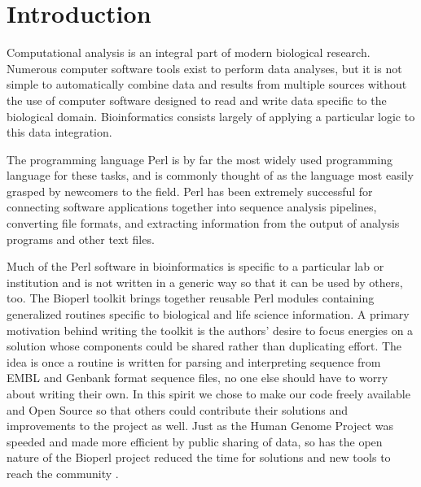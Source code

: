 \documentclass[12pt]{article}
\begin{document}
\section{Introduction}

Computational analysis is an integral part of modern biological
research.  Numerous computer software tools exist to perform 
data analyses, but it is not simple to automatically
combine data and results from multiple sources without the use of
computer software designed to read and write data specific to the
biological domain.  
Bioinformatics consists largely of applying a
particular logic to this data integration.

The programming language Perl \cite{perlref} is by far the most widely used
programming language for these tasks, and is commonly thought of as
the language most easily grasped by newcomers to the field.  Perl has
been extremely successful for connecting software applications together into
sequence analysis pipelines, converting file formats, and extracting
information from the output of analysis programs and other text files.

Much of the Perl software in bioinformatics is specific to a
particular lab or institution and is not written in a generic way so
that it can be used by others, too.  The Bioperl toolkit brings
together reusable Perl modules containing generalized routines
specific to biological and life science information.  A primary
motivation behind writing the toolkit is the authors' desire to focus
energies on a solution whose components could be shared rather than
duplicating effort.  The idea is once a routine is written for
parsing and interpreting sequence from EMBL and Genbank format
sequence files, no one else should have to worry about writing their
own.  In this spirit we chose to make our code freely available and
Open Source \cite{open-sourc-ref} so that others could contribute
their solutions and improvements to the project as well.  Just as the
Human Genome Project was speeded and made more efficient by public
sharing of data, so has the open nature of the Bioperl project reduced
the time for solutions and new tools to reach the community
\cite{waterston}.
\end{document}
